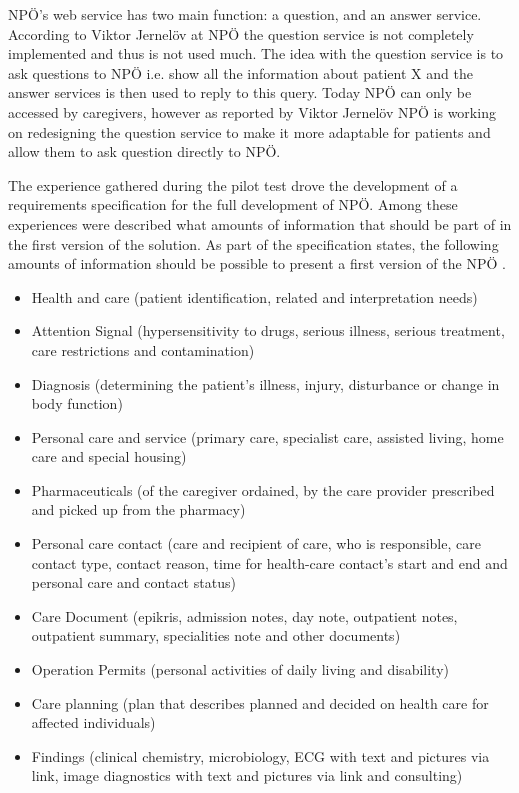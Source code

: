 \documentclass[14pt]{article}
\begin{document}
NPÖ's web service has two main function: a question, and an answer service. According to Viktor Jernelöv at NPÖ \cite{ViktorJernelov} the question service is not completely implemented and thus is not used much. The idea with the question service is to ask questions to NPÖ i.e. show all the information about patient X and the answer services is then used to reply to this query. Today NPÖ can only be accessed by caregivers, however as reported by Viktor Jernelöv \cite{ViktorJernelov} NPÖ is working on redesigning the question service to make it more adaptable for patients and allow them to ask question directly to NPÖ.

The experience gathered during the pilot test drove the development of a requirements specification for the full development of NPÖ. Among these experiences were described what amounts of information that should be part of in the first version of the solution. As part of the specification states, the following amounts of information should be possible to present a first version of the NPÖ \cite{Npotest}.
\begin{itemize}
\item Health and care (patient identification, related and interpretation needs)
\item Attention Signal (hypersensitivity to drugs, serious illness, serious treatment, care restrictions and contamination)
\item Diagnosis (determining the patient's illness, injury, disturbance or change in body function)
\item Personal care and service (primary care, specialist care, assisted living, home care and special housing)
\item Pharmaceuticals (of the caregiver ordained, by the care provider prescribed and picked up from the pharmacy)
\item Personal care contact (care and recipient of care, who is responsible, care contact type, contact reason, time for health-care contact's start and end and personal care and contact status)
\item Care Document (epikris, admission notes, day note, outpatient notes, outpatient summary, specialities note and other documents)
\item Operation Permits (personal activities of daily living and disability)
\item Care planning (plan that describes planned and decided on health care for affected individuals)
\item Findings (clinical chemistry, microbiology, ECG with text and pictures via link, image diagnostics with text and pictures via link and consulting)
\end{itemize}
\end{document}
